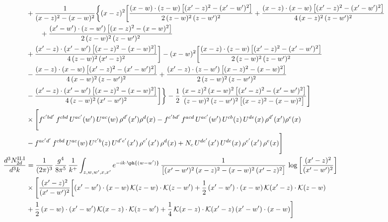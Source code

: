 \begin{align}
&+\frac{1}{(x-z)^{2}-(x-w)^{2}}\bigg\{(x-z)^{2}\bigg[\frac{(x-w)\cdot(z-w)\,\big[(x^{\prime}-z)^{2}-(x^{\prime}-w^{\prime})^{2}\big]}{2\,(z-w)^{2}\,(z-w^{\prime})^{2}}+\frac{(x-z)\cdot(x-w)\,\big[(x^{\prime}-z)^{2}-(x^{\prime}-w^{\prime})^{2}\big]}{4\,(x-z)^{2}\,(z-w^{\prime})^{2}}\notag\\ &\qquad+\frac{(x^{\prime}-w^{\prime})\cdot(z-w^{\prime})\,\big[(x-z)^{2}-(x-w)^{2}\big]}{2\,(z-w)^{2}\,(z-w^{\prime})^{2}}\notag \\ & +\frac{(x^{\prime}-z)\cdot(x^{\prime}-w^{\prime})\,\big[(x-z)^{2}-(x-w)^{2}\big]}{4\,(z-w)^{2}\,(x^{\prime}-z)^{2}}\bigg]-(x-w)^{2}\bigg[\frac{(x-z)\cdot(z-w)\,\big[(x^{\prime}-z)^{2}-(x^{\prime}-w^{\prime})^{2}\big]}{2\,(z-w)^{2}\,(z-w^{\prime})^{2}}\notag \\ & -\frac{(x-z)\cdot(x-w)\,\big[(x^{\prime}-z)^{2}-(x^{\prime}-w^{\prime})^{2}\big]}{4\,(x-w)^{2}\,(z-w^{\prime})^{2}}+\frac{(x^{\prime}-z)\cdot(z-w^{\prime})\,\big[(x-z)^{2}-(x-w)^{2}\big]}{2\,(z-w)^{2}\,(z-w^{\prime})^{2}}\notag \\ & -\frac{(x^{\prime}-z)\cdot(x^{\prime}-w^{\prime})\,\big[(x-z)^{2}-(x-w)^{2}\big]}{4\,(z-w)^{2}\,(x^{\prime}-w^{\prime})^{2}}\bigg]\bigg\}-\frac{1}{2}\,\frac{(x-z)^{2}\,(x-w)^{2}\,\big[(x^{\prime}-z)^{2}-(x^{\prime}-w^{\prime})^{2}\big]}{(z-w)^{2}\,(z-w^{\prime})^{2}\,\big[(x-z)^{2}-(x-w)^{2}\big]}\Bigg]\notag\\
&\times\Bigg[f^{c^{\prime}bd^{\prime}}\,f^{cbd}\, U^{ac^{\prime}}(w^{\prime})\,U^{ac}(w)\,\rho^{d^{\prime}}(x^{\prime})\rho^{d}(x)- f^{c^{\prime}bd^{\prime}}\,f^{acd}\,U^{ac^{\prime}}(w^{\prime})\,U^{cb}(z)\,U^{de}(x)\,\rho^{d^{\prime}}(x^{\prime})\rho^{e}(x) \notag \\ & -f^{ac^{\prime}d^{\prime}}\,f^{cbd}\,U^{ac}(w)\,U^{c^{\prime}b}(z)\,U^{d^{\prime}e^{\prime}}(x^{\prime})\,\rho^{e^{\prime}}(x^{\prime})\,\rho^{d}(x) +N_{c}\,U^{de^{\prime}}(x^{\prime})\,U^{de}(x)\,\rho^{e^{\prime}}(x^{\prime})\,\rho^{e}(x)\Bigg]\\
\frac{d^{3}N^{\rm II.I}_{2d}}{d^{3}k}&= \frac{1}{(2\pi)^{3}}\,\frac{g^{4}}{8\pi^{5}}\,\frac{1}{k^{+}}\int_{z,w,w^{\prime},x,x^{\prime}}e^{-ik\cdot\ph{(w-w^{\prime})}}\,\frac{1}{\big[(x^{\prime}-w^{\prime})^{2}\,(x-z)^{2}-(x-w)^{2}\,(x^{\prime}-z)^{2}\big]}\,\log\left[\frac{(x^{\prime}-z)^{2}}{(x^{\prime}-w^{\prime})^{2}}\right]\notag\\
&\times\Bigg[\frac{(x^{\prime}-z)^{2}}{(x^{\prime}-w^{\prime})^{2}}\bigg[(x^{\prime}-w^{\prime})\cdot(x-w)\,\mathcal{K}(z-w)\cdot\mathcal{K}(z-w^{\prime})+\frac{1}{2}\,(x^{\prime}-w^{\prime})\cdot(x-w)\,\mathcal{K}(x^{\prime}-z)\cdot\mathcal{K}(z-w)\notag \\ & +\frac{1}{2}\,(x-w)\cdot(x^{\prime}-w^{\prime})\,\mathcal{K}(x-z)\cdot\mathcal{K}(z-w^{\prime})+\frac{1}{4}\,\mathcal{K}(x-z)\cdot\mathcal{K}(x^{\prime}-z)\,(x^{\prime}-w^{\prime})\cdot(x-w)\bigg]\notag\\

\end{align}
